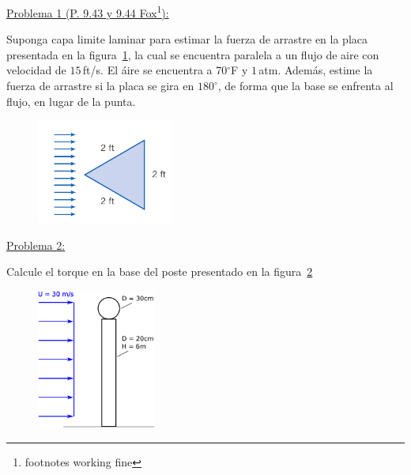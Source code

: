 \documentclass[11pt]{report}
\begin{document}


\vspace{1cm}


\vspace{1cm}

\underline {Problema 1 (P. 9.43 y 9.44 Fox\footnote{footnotes working fine}):}
\vspace{0.2cm}

Suponga capa limite laminar para estimar la fuerza de arrastre en la placa presentada en la figura~\ref{fig:fig1}, la cual se encuentra paralela a un flujo de aire con velocidad de $15$\,ft/s. El \'aire se encuentra  a 70$^\circ$F y $1$\,atm. Adem\'as, estime la fuerza de arrastre si la placa se gira en $180^\circ$, de forma que la base se enfrenta al flujo, en lugar de la punta.

\begin{figure}[H]
\centering\includegraphics[width=0.4\textwidth]{Figures/9_43F.png}
\caption{\label{fig:fig1} }
\end{figure}


\underline {Problema 2:}
\vspace{0.2cm}

Calcule el torque en la base del poste presentado en la figura~\ref{fig:fig2}
\begin{figure}[H]
\centering\includegraphics[width=0.35\textwidth]{Figures/poste.eps}
\caption{\label{fig:fig2} }
\end{figure}
\end{document}
